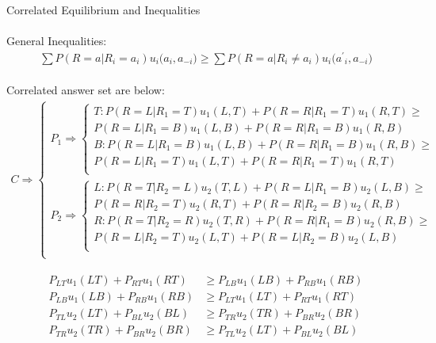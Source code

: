 \documentclass[
  course = {{IE579 Game Theory and Multi-Agent Reinforcement Learning}},
  assignment = 1,
  name = {{Mohammad Mahdi Rahimi}},
  studentnumber = {{20208244}},
  email = {{mahi@kaist.ac.kr}},
  firstexercise = 1
]{aga-homework}
\begin{document}
\subexercise Correlated Equilibrium and Inequalities
\\\\
General Inequalities:\\ 
\begin{equation} \label{eq1}
\begin{split}
\sum{P(R = a | R_i  = a_i) u_i(a_i, a_{-i}}) \ge \sum{P(R = a | R_i  \neq a_i) u_i({a^\prime}_i, a_{-i}})
\end{split}
\end{equation}
\\
Correlated answer set are below:\\ 
\begin{equation}
    \begin{split}
    C \Rightarrow \begin{cases}
    P_1 \Rightarrow 
     \begin{cases}
            T: P(R = L | R_1  = T) u_1(L, T) + P(R = R | R_1  = T) u_1(R, T) \ge\\
            P(R = L | R_1 = B) u_1(L, B) + P(R = R | R_1  = B) u_1(R, B)\\
            B: P(R = L | R_1  = B) u_1(L, B) + P(R = R | R_1  = B) u_1(R, B) \ge\\
            P(R = L | R_1 = T) u_1(L, T) + P(R = R | R_1  = T) u_1(R, T)\\
     \end{cases}\\
    P_2 \Rightarrow 
     \begin{cases}
            L: P(R = T | R_2  = L) u_2(T, L) + P(R = L | R_1  = B) u_2(L, B) \ge\\
            P(R = R | R_2 = T) u_2(R, T) + P(R = R | R_2  = B) u_2(R, B)\\
            R: P(R = T | R_2  = R) u_2(T, R) + P(R = R | R_1  = B) u_2(R, B) \ge\\
            P(R = L | R_2 = T) u_2(L, T) + P(R = L | R_2  = B) u_2(L, B)\\
     \end{cases}\\
    \end{cases}
    \end{split}
\end{equation}

\begin{equation}
    \begin{split}
    P_{LT}u_1(LT) + P_{RT}u_1(RT) & \ge P_{LB}u_1(LB) + P_{RB}u_1(RB) \\
    P_{LB}u_1(LB) + P_{RB}u_1(RB) & \ge P_{LT}u_1(LT) + P_{RT}u_1(RT) \\
    P_{TL}u_2(LT) + P_{BL}u_2(BL) & \ge P_{TR}u_2(TR) + P_{BR}u_2(BR) \\
    P_{TR}u_2(TR) + P_{BR}u_2(BR) & \ge P_{TL}u_2(LT) + P_{BL}u_2(BL)
    \end{split}
\end{equation}
\end{document}
